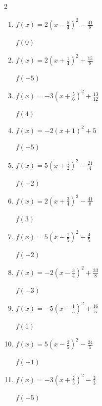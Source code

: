 \begin{multicols}{2}
\begin{enumerate}
  \item $\displaystyle f(x)=2\left( x-\frac{5}{4}\right)^{2}-\frac{41}{8}$

$f(0)$
        \phantom{$=-2$}

  \item $\displaystyle f(x)=2\left( x+\frac{1}{4}\right)^{2}+\frac{15}{8}$

$f(-5)$
        \phantom{$=47$}

  \item $\displaystyle f(x)=-3\left( x+\frac{5}{6}\right)^{2}+\frac{13}{12}$

$f(4)$
        \phantom{$=-69$}

  \item $\displaystyle f(x)=-2\left( x+1\right)^{2}+5$

$f(-5)$
        \phantom{$=-27$}

  \item $\displaystyle f(x)=5\left( x+\frac{1}{2}\right)^{2}-\frac{21}{4}$

$f(-2)$
        \phantom{$=6$}

\columnbreak %

  \item $\displaystyle f(x)=2\left( x+\frac{3}{4}\right)^{2}-\frac{41}{8}$

$f(3)$
        \phantom{$=23$}

  \item $\displaystyle f(x)=5\left( x-\frac{1}{5}\right)^{2}+\frac{4}{5}$

$f(-2)$
        \phantom{$=25$}

  \item $\displaystyle f(x)=-2\left( x-\frac{3}{4}\right)^{2}+\frac{33}{8}$

$f(-3)$
        \phantom{$=-24$}

  \item $\displaystyle f(x)=-5\left( x-\frac{1}{5}\right)^{2}+\frac{16}{5}$

$f(1)$
        \phantom{$=0$}

  \item $\displaystyle f(x)=5\left( x-\frac{2}{5}\right)^{2}-\frac{24}{5}$

$f(-1)$
        \phantom{$=5$}

\columnbreak %

\resetques

  \item $\displaystyle f(x)=-3\left( x+\frac{2}{3}\right)^{2}-\frac{2}{3}$

$f(-5)$
        \phantom{$=-57$}


\end{enumerate}
\end{multicols}
